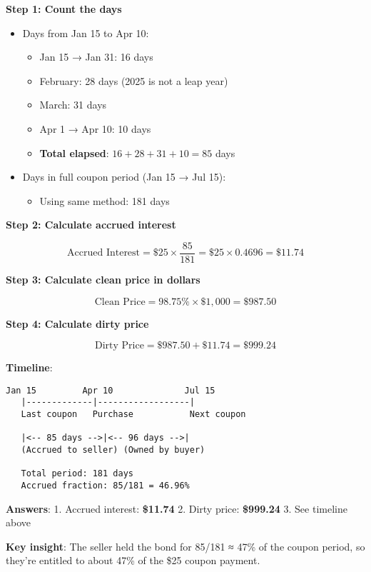 \documentclass[
  letterpaper,
]{scrbook}
\providecommand{\tightlist}{%
  \setlength{\itemsep}{0pt}\setlength{\parskip}{0pt}}
\begin{document}
\begin{tcolorbox}[enhanced jigsaw, toptitle=1mm, colbacktitle=quarto-callout-tip-color!10!white, opacityback=0, leftrule=.75mm, breakable, colframe=quarto-callout-tip-color-frame, toprule=.15mm, opacitybacktitle=0.6, coltitle=black, bottomrule=.15mm, colback=white, arc=.35mm, titlerule=0mm, rightrule=.15mm, left=2mm, title={Click to reveal solution}, bottomtitle=1mm]

\textbf{Step 1: Count the days}

\begin{itemize}
\tightlist
\item
  Days from Jan 15 to Apr 10:

  \begin{itemize}
  \tightlist
  \item
    Jan 15 → Jan 31: 16 days
  \item
    February: 28 days (2025 is not a leap year)
  \item
    March: 31 days
  \item
    Apr 1 → Apr 10: 10 days
  \item
    \textbf{Total elapsed}: \(16 + 28 + 31 + 10 = 85\) days
  \end{itemize}
\item
  Days in full coupon period (Jan 15 → Jul 15):

  \begin{itemize}
  \tightlist
  \item
    Using same method: 181 days
  \end{itemize}
\end{itemize}

\textbf{Step 2: Calculate accrued interest}

\[
\text{Accrued Interest} = \$25 \times \frac{85}{181} = \$25 \times 0.4696 = \$11.74
\]

\textbf{Step 3: Calculate clean price in dollars}

\[
\text{Clean Price} = 98.75\% \times \$1,000 = \$987.50
\]

\textbf{Step 4: Calculate dirty price}

\[
\text{Dirty Price} = \$987.50 + \$11.74 = \$999.24
\]

\textbf{Timeline}:

\begin{verbatim}
Jan 15         Apr 10              Jul 15
   |-------------|------------------|
   Last coupon   Purchase           Next coupon
   
   |<-- 85 days -->|<-- 96 days -->|
   (Accrued to seller) (Owned by buyer)
   
   Total period: 181 days
   Accrued fraction: 85/181 = 46.96%
\end{verbatim}

\textbf{Answers}: 1. Accrued interest: \textbf{\$11.74} 2. Dirty price:
\textbf{\$999.24} 3. See timeline above

\textbf{Key insight}: The seller held the bond for 85/181 ≈ 47\% of the
coupon period, so they're entitled to about 47\% of the \$25 coupon
payment.

\end{tcolorbox}
\end{document}

